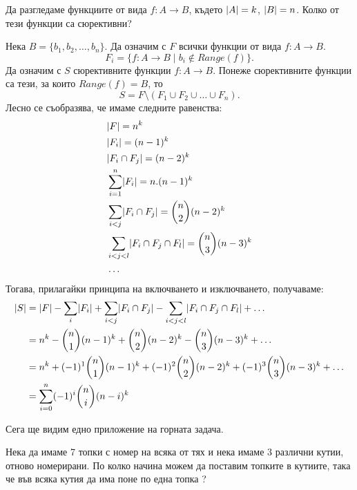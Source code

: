 \begin{problem}
  Да разгледаме функциите от вида $f:A\to B$, където $\lvert{A}\rvert = k$, $\lvert{B}\rvert = n$.
  Колко от тези функции са сюрективни?
\end{problem}
\begin{solution}
  Нека $B = \{b_1,b_2,\dots,b_n\}$.
  Да означим с $F$ всички функции от вида $f:A\to B$.
  \[F_i = \{f:A\to B\mid b_i \not\in Range(f)\}.\]
  Да означим с $S$ сюрективните функции $f:A\to B$.
  Понеже сюрективните функции са тези, за които $Range(f) = B$, то
  \[S = F\setminus(F_1\cup F_2 \cup \dots \cup F_n).\]
  Лесно се съобразява, че имаме следните равенства:
  \begin{align*}
    & \lvert{F}\rvert = n^k\\
    & \lvert{F_i}\rvert = (n-1)^k\\
    & \lvert{F_i \cap F_j}\rvert = (n-2)^k\\
    & \sum^n_{i=1}\lvert{F_i}\rvert = n.(n-1)^k\\
    & \sum_{i < j}\lvert{F_i \cap F_j}\rvert = \binom{n}{2}(n-2)^k\\
    & \sum_{i < j < l}\lvert{F_i \cap F_j \cap F_l}\rvert = \binom{n}{3}(n-3)^k\\
    & \dots
  \end{align*}
  Тогава, прилагайки принципа на включването и изключването, получаваме:
  \begin{align*}
    \lvert{S}\rvert & = \lvert{F}\rvert - \sum_i \lvert{F_i}\rvert + \sum_{i < j}\lvert{F_i\cap F_j}\rvert - \sum_{i < j < l}\lvert{F_i \cap F_j \cap F_l}\rvert + \dots \\
    & = n^k - \binom{n}{1}(n-1)^k + \binom{n}{2}(n-2)^k - \binom{n}{3}(n-3)^k + \dots\\
    & = n^k + (-1)^1\binom{n}{1}(n-1)^k + (-1)^2\binom{n}{2}(n-2)^k + (-1)^3\binom{n}{3}(n-3)^k + \dots\\
    & = \sum^n_{i=0}(-1)^i\binom{n}{i}(n-i)^k
  \end{align*}
\end{solution}

Сега ще видим едно приложение на горната задача.

\begin{problem}
  Нека да имаме 7 топки с номер на всяка от тях и нека имаме 3 различни кутии, отново номерирани.
  По колко начина можем да поставим топките в кутиите, така че във всяка кутия да има поне по една топка ?
\end{problem}

